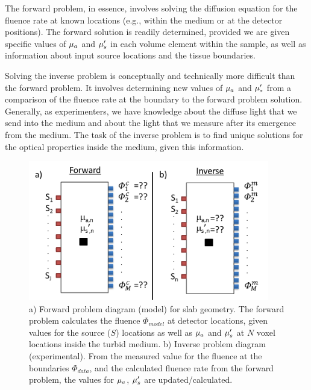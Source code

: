 The forward problem, in essence, involves solving the diffusion equation for the fluence rate at known locations (e.g., within the medium or at the detector positions). The forward solution is readily determined, provided we are given specific values of $\mu_a$ and $\mu_s^{\prime}$ in each volume element within the sample, as well as information about input source locations and the tissue boundaries.

Solving the inverse problem is conceptually and technically more difficult than the forward problem. It involves determining new values of $\mu_a$ and $\mu_s^{\prime}$ from a comparison of the fluence rate at the boundary to the forward problem solution. Generally, as experimenters, we have knowledge about the diffuse light that we send into the medium and about the light that we measure after its emergence from the medium. The task of the inverse problem is to find unique solutions for the optical properties inside the medium, given this information.
%
\begin{figure}[t]
\centering
\includegraphics[width=10.5cm]{./figures/2_Theory/forwardinverse.png}
\caption[Forward and inverse problem diagrams]{a) Forward problem diagram (model) for slab geometry. The forward problem calculates the fluence $\Phi_{model}$ at detector locations, given values for the source ($S$) locations as well as $\mu_a$ and $\mu_s^{\prime}$ at $N$ voxel locations inside the turbid medium. b) Inverse problem diagram (experimental). From the measured value for the fluence at the boundaries $\Phi_{data}$, and the calculated fluence rate from the forward problem, the values for $\mu_a$, $\mu_s^{\prime}$ are updated/calculated.}
\label{fig:forwardinverse}
\end{figure}

